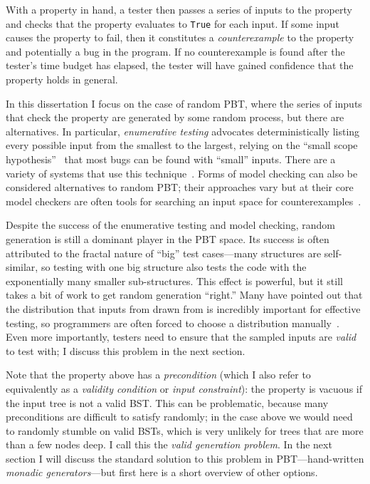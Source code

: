 With a property in hand, a tester then passes a series of inputs to the property
and checks that the property evaluates to \lstinline{True} for each input.  If
some input causes the property to fail, then it constitutes a {\em
counterexample} to the property and potentially a bug in the program. If no
counterexample is found after the tester's time budget has elapsed, the tester
will have gained confidence that the property holds in general.

In this dissertation I focus on the case of random PBT, where the series of
inputs that check the property are generated by some random process, but there
are alternatives. In particular, {\em enumerative testing} advocates
deterministically listing every possible input from the smallest to the largest,
relying on the ``small scope hypothesis''~\cite{jackson1996elements} that most
bugs can be found with ``small'' inputs. There are a variety of systems that use
this technique~\cite{DBLP:conf/haskell/RuncimanNL08,leancheck}. Forms of model
checking can also be considered alternatives to random PBT; their approaches
vary but at their core model checkers are often tools for searching an input
space for counterexamples~\cite{biere2009bounded}.

Despite the success of the enumerative testing and model checking, random
generation is still a dominant player in the PBT space. Its success is often
attributed to the fractal nature of ``big'' test cases---many structures are
self-similar, so testing with one big structure also tests the code with the
exponentially many smaller sub-structures. This effect is powerful, but it still
takes a bit of work to get random generation ``right.'' Many have pointed out
that the distribution that inputs from drawn from is incredibly important for
effective testing, so programmers are often forced to choose a distribution
manually~\cite{DBLP:conf/icfp/ClaessenH00}. Even more importantly, testers need
to ensure that the sampled inputs are {\em valid} to test with; I discuss this
problem in the next section.

%
%
Note that the property above has a {\em precondition} (which I also refer to
equivalently as a {\em validity condition} or {\em input constraint}): the
property is vacuous if the input tree is not a valid BST. This can be problematic,
because many preconditions are difficult to satisfy randomly; in the case above
we would need to randomly stumble on valid BSTs, which is very unlikely for
trees that are more than a few nodes deep. I call this the {\em valid generation
problem}. In the next section I will discuss the standard solution to this
problem in PBT---hand-written {\em monadic generators}---but first here is a
short overview of other options.


